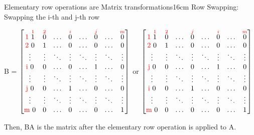 \begin{definition}{Elementary row operations are Matrix transformations}{16cm}
        \hspace{0.5cm}
        {\color{lgreen} Row Swapping}:
        Swapping the i-th and j-th row

        \hspace{1cm}
        B =
        $\begin{bmatrix}
            \text{\color{red} 1 } \overset{{\color{red} 1}}{1}
                & \overset{{\color{red} 2}}{0} & \hdots
                & \overset{{\color{red} i}}{0} & \hdots
                & \overset{{\color{red} j}}{0} & \hdots
                & \overset{{\color{red} m}}{0} \\
            \text{\color{red} 2 } 0 & 1 & \hdots & 0 & \hdots & 0 & \hdots & 0 \\
            \vdots & \vdots & \ddots & \vdots & \ddots & \vdots & \ddots & \vdots \\
            \text{\color{red} i } 0 & 0 & \hdots & 0 & \hdots & 1 & \hdots & 0 \\
            \vdots & \vdots & \ddots & \vdots & \ddots & \vdots & \ddots & \vdots \\
            \text{\color{red} j } 0 & 0 & \hdots & 1 & \hdots & 0 & \hdots & 0 \\
            \vdots & \vdots & \ddots & \vdots & \ddots & \vdots & \ddots & \vdots \\
            \text{\color{red} m } 0 & 0 & \hdots & 0 & \hdots & 0 & \hdots & 1
        \end{bmatrix}$
        or
        $\begin{bmatrix}
            \text{\color{red} 1 } \overset{{\color{red} 1}}{1}
                & \overset{{\color{red} 2}}{0} & \hdots
                & \overset{{\color{red} j}}{0} & \hdots
                & \overset{{\color{red} i}}{0} & \hdots
                & \overset{{\color{red} m}}{0} \\
            \text{\color{red} 2 } 0 & 1 & \hdots & 0 & \hdots & 0 & \hdots & 0 \\
            \vdots & \vdots & \ddots & \vdots & \ddots & \vdots & \ddots & \vdots \\
            \text{\color{red} j } 0 & 0 & \hdots & 0 & \hdots & 1 & \hdots & 0 \\
            \vdots & \vdots & \ddots & \vdots & \ddots & \vdots & \ddots & \vdots \\
            \text{\color{red} i } 0 & 0 & \hdots & 1 & \hdots & 0 & \hdots & 0 \\
            \vdots & \vdots & \ddots & \vdots & \ddots & \vdots & \ddots & \vdots \\
            \text{\color{red} m } 0 & 0 & \hdots & 0 & \hdots & 0 & \hdots & 1
        \end{bmatrix}$

        Then, BA is the matrix after the elementary row operation is applied to A.
    \end{definition}

